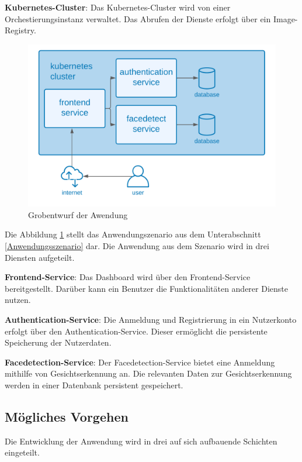 \textbf{Kubernetes-Cluster}: Das Kubernetes-Cluster wird von einer Orchestierungsinstanz verwaltet.
Das Abrufen der Dienste erfolgt über ein Image-Registry.

\begin{figure}[!htb]
    \centering
    \includegraphics[width=0.8\columnwidth]{images/GrobentwurfAnwendung.png}
    \caption{Grobentwurf der Awendung}
    \label{fig:GrobentwurfAnwendung}
  \end{figure}

Die Abbildung \ref{fig:GrobentwurfAnwendung} stellt das Anwendungszenario aus dem Unterabschnitt \ref{Anwendungsszenario} dar.
Die Anwendung aus dem Szenario wird in drei Diensten aufgeteilt.

\textbf{Frontend-Service}: Das Dashboard wird über den Frontend-Service bereitgestellt.
Darüber kann ein Benutzer die Funktionalitäten anderer Dienste nutzen.

\textbf{Authentication-Service}: Die Anmeldung und Registrierung in ein Nutzerkonto erfolgt über den Authentication-Service.
Dieser ermöglicht die persistente Speicherung der Nutzerdaten.

\textbf{Facedetection-Service}: Der Facedetection-Service bietet eine Anmeldung mithilfe von Gesichtserkennung an.
Die relevanten Daten zur Gesichtserkennung werden in einer Datenbank persistent gespeichert.

\subsection{Mögliches Vorgehen}

Die Entwicklung der Anwendung wird in drei auf sich aufbauende Schichten eingeteilt.

